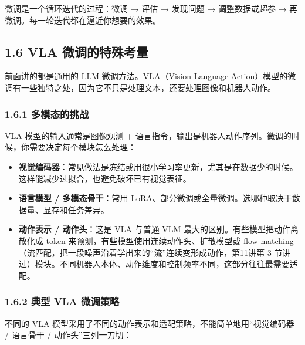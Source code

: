 \documentclass[
  chinese,
]{ctexart}
\providecommand{\tightlist}{%
  \setlength{\itemsep}{0pt}\setlength{\parskip}{0pt}}
\begin{document}
微调是一个循环迭代的过程：微调 → 评估 → 发现问题 → 调整数据或超参 →
再微调。每一轮迭代都在逼近你想要的效果。

\subsection{1.6 VLA
微调的特殊考量}\label{vla-ux5faeux8c03ux7684ux7279ux6b8aux8003ux91cf}

前面讲的都是通用的 LLM
微调方法。VLA（Vision-Language-Action）模型的微调有一些独特之处，因为它不只是处理文本，还要处理图像和机器人动作。

\subsubsection{1.6.1
多模态的挑战}\label{ux591aux6a21ux6001ux7684ux6311ux6218}

VLA 模型的输入通常是图像观测 +
语言指令，输出是机器人动作序列。微调的时候，你需要决定每个模块怎么处理：

\begin{itemize}
\tightlist
\item
  \textbf{视觉编码器}：常见做法是冻结或用很小学习率更新，尤其是在数据少的时候。这样能减少过拟合，也避免破坏已有视觉表征。
\item
  \textbf{语言模型 / 多模态骨干}：常用
  LoRA、部分微调或全量微调。选哪种取决于数据量、显存和任务差异。
\item
  \textbf{动作表示 / 动作头}：这是 VLA 与普通 VLM
  最大的区别。有些模型把动作离散化成 token
  来预测，有些模型使用连续动作头、扩散模型或 flow
  matching（流匹配，把一段噪声沿着学出来的``流''连续变形成动作，第11讲第
  3
  节讲过）模块。不同机器人本体、动作维度和控制频率不同，这部分往往最需要适配。
\end{itemize}

\subsubsection{1.6.2 典型 VLA
微调策略}\label{ux5178ux578b-vla-ux5faeux8c03ux7b56ux7565}

不同的 VLA 模型采用了不同的动作表示和适配策略，不能简单地用``视觉编码器
/ 语言骨干 / 动作头''三列一刀切：
\end{document}

